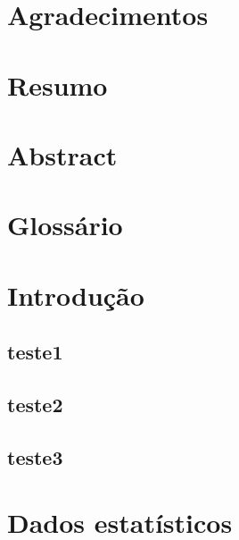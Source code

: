 \documentclass{ppgmus}
\begin{document}
\frontmatter

\maketitle

\chapter*{Agradecimentos}
\label{cha:agradecimentos}

\chapter*{Resumo}
\label{cha:resumo}

\chapter*{Abstract}
\label{cha:abstract}

\tableofcontents
{}

\listoftables
\listoffigures

\chapter*{Glossário}
\label{cha:glossario}


\mainmatter

\chapter{Introdução}


\section{teste1}

\newpage

\section{teste2}

\newpage

\section{teste3}

\appendix

\chapter{Dados estatísticos}
\label{cha:dados-estatisticos}




\end{document}
